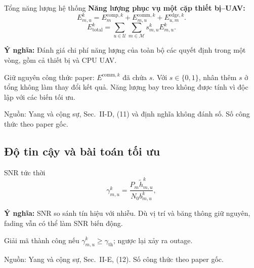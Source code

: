 \documentclass[10pt,aspectratio=43]{beamer}
\newcommand{\source}[1]{\par\vfill{\fontsize{5.8}{7}\selectfont\color{Muted}Nguồn: #1\par}}
\newcommand{\paperref}[1]{\source{Yang và cộng sự, Sec.~#1. Số công thức theo paper gốc.}}
\newcommand{\eqmeaning}[1]{\par\medskip\textcolor{HustRed}{\textbf{Ý nghĩa:}} #1\par}
\newcommand{\noteonly}[1]{\par{\footnotesize\color{Muted}#1\par}}
\newcommand{\tot}{\mathrm{total}}
\begin{document}
\begin{frame}[t]{Tổng năng lượng hệ thống}
\relax
\textbf{Năng lượng phục vụ một cặp thiết bị--UAV:}
\[
E_{m,u}^k=E_m^{\mathrm{comp},k}+E_{m,u}^{\mathrm{comm},k}
                          +E_{u,m}^{\mathrm{edge},k}.
\]
\begin{equation}
E_{\tot}^k=\sum_{u\in\mathcal U}\sum_{m\in\mathcal M}s_{m,u}^kE_{m,u}^k.
\tag{11}
\end{equation}
\par{}
\eqmeaning{Đánh giá chi phí năng lượng của toàn bộ các quyết định trong một vòng, gồm cả thiết bị và CPU UAV.}
\noteonly{Giữ nguyên công thức paper: $E^{\mathrm{comm},k}$ đã chứa $s$. Với $s\in\{0,1\}$, nhân thêm $s$ ở tổng không làm thay đổi kết quả. Năng lượng bay treo không được tính vì độc lập với các biến tối ưu.}
\paperref{II-D, (11) và định nghĩa không đánh số}
\end{frame}
\subsection{Độ tin cậy và bài toán tối ưu}

\begin{frame}[t]{SNR tức thời}
\relax
\begin{equation}\gamma_{m,u}^k=\frac{P_m\widetilde h_{m,u}^k}{N_0b_{m,u}^k},\tag{12}\end{equation}\par{}\eqmeaning{SNR so sánh tín hiệu với nhiễu. Dù vị trí và băng thông giữ nguyên, fading vẫn có thể làm SNR biến động.}
\noteonly{Giải mã thành công nếu $\gamma_{m,u}^k\geq\gamma_{\mathrm{th}}$; ngược lại xảy ra outage.}
\paperref{II-E, (12)}
\end{frame}
\end{document}

